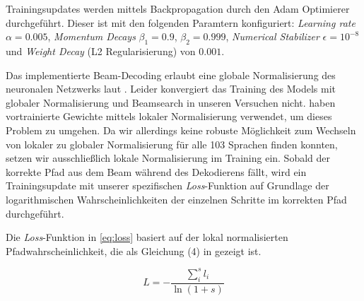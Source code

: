 \documentclass[a4paper]{article}
\begin{document}
Trainingsupdates werden mittels Backpropagation durch den Adam Optimierer \citep{adam:KingmaB14} durchgeführt.
Dieser ist mit den folgenden Paramtern konfiguriert: \textit{Learning rate} $\alpha=0.005$, \textit{Momentum Decays} $\beta_1=0.9$, $\beta_2=0.999$, \textit{Numerical Stabilizer} $\epsilon=10^{-8}$ und \textit{Weight Decay} (L2 Regularisierung) von $0.001$.


Das implementierte Beam-Decoding erlaubt eine globale Normalisierung des neuronalen Netzwerks laut \citet{globalnorm:AndorAWSPGPC16}.
Leider konvergiert das Training des Models mit globaler Normalisierung und Beamsearch in unseren Versuchen nicht.
\citet{globalnorm:AndorAWSPGPC16} haben vortrainierte Gewichte mittels lokaler Normalisierung verwendet, um dieses Problem zu umgehen.
Da wir allerdings keine robuste Möglichkeit zum Wechseln von lokaler zu globaler Normalisierung für alle 103 Sprachen finden konnten, setzen wir ausschließlich lokale Normalisierung im Training ein.
Sobald der korrekte Pfad aus dem Beam während des Dekodierens fällt, wird ein Trainingsupdate mit unserer spezifischen \textit{Loss}-Funktion auf Grundlage der logarithmischen Wahrscheinlichkeiten der einzelnen Schritte im korrekten Pfad durchgeführt.




Die \textit{Loss}-Funktion in \autoref{eq:loss} basiert auf der lokal normalisierten Pfadwahrscheinlichkeit, die als Gleichung (4) in \citet{globalnorm:AndorAWSPGPC16} gezeigt ist. 


\begin{equation}
\label{eq:loss}
L = - \frac{\sum_i^s l_i}{\ln{(1+s)}}
\end{equation}

\end{document}
